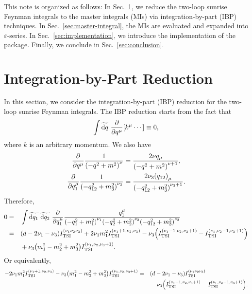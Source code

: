 \documentclass{article}
\begin{document}
        This note is organized as follows:
        In Sec.~\ref{sec:reduction}, we reduce the two-loop sunrise Feynman integrals to the master integrals (MIs) via integration-by-part (IBP) techniques.
        In Sec.~\ref{sec:master-integral}, the MIs are evaluated and expanded into $\varepsilon$-series.
        In Sec.~\ref{sec:implementation}, we introduce the implementation of the package.
        Finally, we conclude in Sec.~\ref{sec:conclusion}.
    
    \section{Integration-by-Part Reduction}\label{sec:reduction}

        In this section, we consider the integration-by-part (IBP) reduction for the two-loop sunrise Feynman integrals.
        The IBP reduction starts from the fact that \cite[Eq.~(6.2)]{Weinzierl:2022eaz}
        \begin{equation}
            \int \widetilde{\dd{q}} ~ \pdv{q^\mu} \qty[k^\mu \cdots] \equiv 0,
        \end{equation}
        where $k$ is an arbitrary momentum.
        We also have
        \begin{align}
            \pdv{q^\mu} \frac{1}{\denominator{q}[m][\nu]} & = \frac{2 \nu q_\mu}{\denominator{q}[m][\nu + 1]}, \\
            \pdv{q_1^\mu} \frac{1}{\qmThree*} & = \frac{2 \nu_3 \qty(q_{12})_\mu}{\qmThree[\nu_3 + 1]}.
        \end{align}
        Therefore,
        \begin{equation}
            \begin{aligned}
                0 & = & & \int \tildedp{q_1} ~ \tildedp{q_2} ~ \pdv{q_1^\mu} \frac{q_1^\mu}{\qmOne* \qmTwo* \qmThree*} \\
                & = & & \qty(d - 2 \nu_1 - \nu_3) \TSI{\nu_1 \nu_2 \nu_3} + 2 \nu_1 m_1^2 \TSI{\nu_1 + 1, \nu_2, \nu_3} - \nu_3 \qty(\TSI{\nu_1 - 1, \nu_2, \nu_3 + 1} - \TSI{\nu_1, \nu_2 - 1, \nu_3 + 1}) \\
                & & & {} + \nu_3 \qty(m_1^2 - m_2^2 + m_3^2) \TSI{\nu_1, \nu_2, \nu_3 + 1}.
            \end{aligned}
        \end{equation}
        Or equivalently,
        \begin{equation}
            \begin{aligned}
                -2 \nu_1 m_1^2 \TSI{\nu_1 + 1, \nu_2, \nu_3} - \nu_3 \qty(m_1^2 - m_2^2 + m_3^2) \TSI{\nu_1, \nu_2, \nu_3 + 1} & = & & \qty(d - 2 \nu_1 - \nu_3) \TSI{\nu_1 \nu_2 \nu_3} \\
                & & & {} - \nu_3 \qty(\TSI{\nu_1 - 1, \nu_2, \nu_3 + 1} - \TSI{\nu_1, \nu_2 - 1, \nu_3 + 1}). \\
            \end{aligned}
            \label{eq:IBP-1}
        \end{equation}
\end{document}
